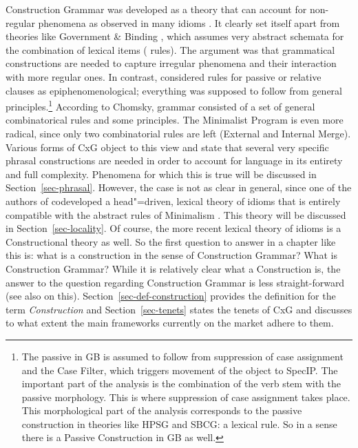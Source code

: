 \documentclass[output=paper
	        ,collection
	        ,collectionchapter
 	        ,biblatex
                ,babelshorthands
                ,newtxmath
                ,draftmode
                ,colorlinks, citecolor=brown
]{langscibook}
\begin{document}

Construction Grammar was developed as a theory that can account for non-regular phenomena as observed
in many idioms \citep*{FKoC88a}. It clearly set itself apart from theories like Government \& Binding
\citep{Chomsky81a}, which assumes very abstract schemata for the combination of lexical items (\xbar
rules). The argument was that grammatical constructions are needed to capture irregular phenomena
and their interaction with more regular ones. In contrast, \citet[]{Chomsky81a} considered
rules for passive or relative clauses as epiphenomenological; everything was supposed to follow from
general principles.\footnote{
  The passive in GB is assumed to follow from suppression of case assignment and the Case Filter,
  which triggers movement of the object to SpecIP. The important part of the analysis is the combination of the verb stem
  with the passive morphology. This is where suppression of case assignment takes place. This
  morphological part of the analysis corresponds to the passive construction in theories like HPSG
  and SBCG: a lexical rule. So in a sense there is a Passive Construction in GB as well.%
} According to Chomsky, grammar consisted of a set of general combinatorical rules
and some principles. The Minimalist Program \citep{Chomsky95a-u} is even more radical, since only two combinatorial rules
are left (External and Internal Merge). Various forms of CxG object to this view and state that
several very specific phrasal constructions are needed in order to account for language in its
entirety and full complexity. Phenomena for which this is true will be discussed in
Section~\ref{sec-phrasal}. However, the case is not as clear in general, since one of the authors of
\citet*{FKoC88a} codeveloped a head"=driven, lexical theory of idioms that is entirely compatible with the abstract rules of
Minimalism \citep*{Sag2007a,KSF2015a,KM2019a}. This theory will be discussed in
Section~\ref{sec-locality}. Of course, the more recent lexical theory of idioms is a Constructional
theory as well. So the first question to answer in a chapter like this is: what is a construction in
the sense of Construction Grammar? What is Construction Grammar? While it is
relatively clear what a Construction is, the answer to the question regarding Construction Grammar
is less straight-forward (see also \citealt[]{Fillmore88a} on this). Section~\ref{sec-def-construction} provides the definition for the term
\emph{Construction} and Section~\ref{sec-tenets} states the tenets of CxG and discusses to what
extent the main frameworks currently on the market adhere to them.
\end{document}
